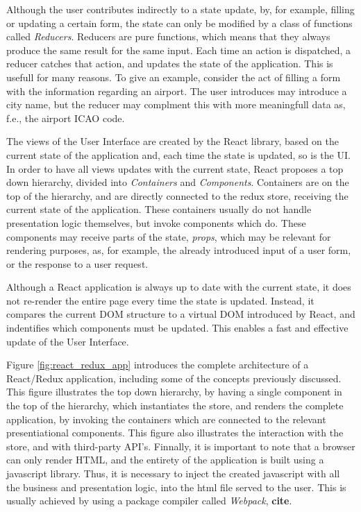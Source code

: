 Although the user contributes indirectly to a state update, by, for example, filling or updating a certain form,
the state can only be modified by a class of functions called \textit{Reducers}.
Reducers are pure functions, which means that they always produce the same result for the same input.
Each time an action is dispatched, a reducer catches that action, and updates the state of the application.
This is usefull for many reasons. To give an example, consider the act of filling a form with the information 
regarding an airport. The user introduces may introduce a city name, but the reducer 
may complment this with more meaningfull data as, f.e., the airport ICAO code.  

The views of the User Interface are created by the React library,
based on the current state of the application and, each time the state is updated,
so is the UI. In order to have all views updates with the current state,
React proposes a top down hierarchy, divided into \textit{Containers} and \textit{Components}.
Containers are on the top of the hierarchy, and are directly connected to the redux store,
receiving the current state of the application. These containers usually
do not handle presentation logic themselves, but invoke components which do.
These components may receive parts of the state, \textit{props}, which may be relevant for rendering purposes,
as, for example, the already introduced input of a user form, or the response to a user request.

Although a React application is always up to date with the current state,
it does not re-render the entire page every time the state is updated. 
Instead, it compares the current DOM structure to a virtual DOM introduced by React,
and indentifies which components must be updated. This enables a fast and effective 
update of the User Interface.

Figure \ref{fig:react_redux_app} introduces the complete architecture of a React/Redux application, 
including some of the concepts previously discussed.
This figure illustrates the top down hierarchy, by having a single component in the top of the hierarchy,
which instantiates the store, and renders the complete application, by invoking the containers 
which are connected to the relevant presentiational components.
This figure also illustrates the interaction with the store, and with third-party API's.
Finnally, it is important to note that a browser can only render HTML,
and the entirety of the application is built using a javascript library. Thus, it is necessary 
to inject the created javascript with all the business and presentation logic, into the html file served 
to the user. This is usually achieved by using a package compiler called \textit{Webpack}, \textbf{cite}.

